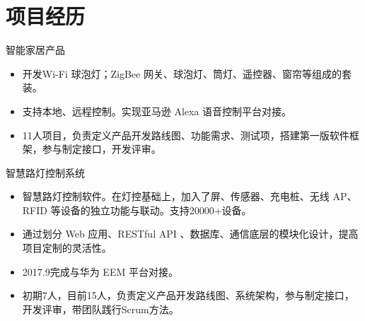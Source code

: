 \documentclass[11pt,a4paper]{moderncv/moderncv}
\begin{document}



\section{项目经历}

{智能家居产品}
{}
{}{}
{
\begin{itemize}
	\item 开发Wi-Fi 球泡灯；ZigBee 网关、球泡灯、筒灯、遥控器、窗帘等组成的套装。
	\item 支持本地、远程控制。实现亚马逊 Alexa 语音控制平台对接。
	\item 11人项目，负责定义产品开发路线图、功能需求、测试项，搭建第一版软件框架，参与制定接口，开发评审。
\end{itemize}
}

{智慧路灯控制系统}
{}
{}{}
{
\begin{itemize}
	\item 智慧路灯控制软件。在灯控基础上，加入了屏、传感器、充电桩、无线 AP、RFID 等设备的独立功能与联动。支持20000+设备。
	\item 通过划分 Web 应用、RESTful API 、数据库、通信底层的模块化设计，提高项目定制的灵活性。
	\item 2017.9完成与华为 EEM 平台对接。
	\item 初期7人，目前15人，负责定义产品开发路线图、系统架构，参与制定接口，开发评审，带团队践行Scrum方法。
\end{itemize}
}
\end{document}
